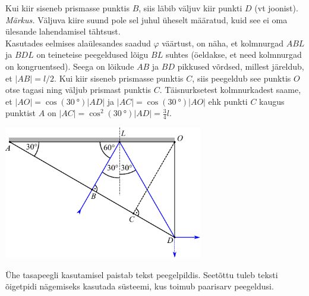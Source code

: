 {\osa Kui kiir siseneb prismasse punktis $B$, siis läbib väljuv kiir punkti $D$ (vt joonist).\\
\emph{Märkus.} Väljuva kiire suund pole sel juhul üheselt määratud, kuid see ei oma ülesande lahendamisel tähtsust.\\
Kasutades eelmises alaülesandes saadud $\varphi$ väärtust, on näha, et kolmnurgad $ABL$ ja $BDL$ on teineteise peegeldused lõigu $BL$ suhtes (öeldakse, et need kolmnurgad on kongruentsed). Seega on lõikude $AB$ ja $BD$ pikkused võrdsed, millest järeldub, et $|AB|=l/2$. Kui kiir siseneb prismasse punktis $C$, siis peegeldub see punktis $O$ otse tagasi ning väljub prismast punktis $C$. Täisnurksetest kolmnurkadest saame, et $|AO|=\cos(\SI{30}{\degree})|AD|$ ja $|AC|=\cos(\SI{30}{\degree})|AO|$ ehk punkti $C$ kaugus punktist $A$ on $|AC|=\cos^2(\SI{30}{\degree})|AD|=\frac{3}{4}l$.

\begin{center}
  \includegraphics[width=0.65\textwidth]{2014-v3g-04-periskoopprillid_lahendus_joonis3.pdf}
\end{center}

\osa Ühe tasapeegli kasutamisel paistab tekst peegelpildis. Seetõttu tuleb teksti õigetpidi nägemiseks kasutada süsteemi, kus toimub paarisarv peegeldusi.
\fi


}
